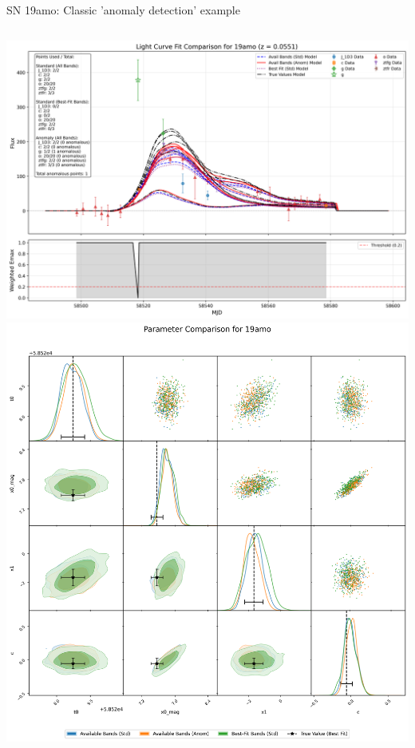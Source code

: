 \documentclass[aspectratio=169]{beamer}
\begin{document}
\begin{frame}{SN 19amo: Classic 'anomaly detection' example}
  \begin{columns}
    \includegraphics[width=\textwidth]{images/light_curve_comparison_19amo.png}
    \includegraphics[width=\textwidth]{images/corner_comparison_19amo.png}
  \end{columns}
\end{frame}
\end{document}
